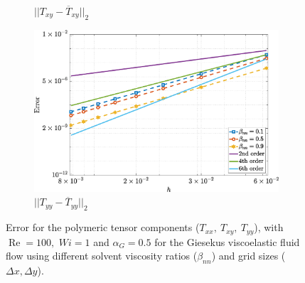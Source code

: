 \documentclass[preprint, 12pt]{elsarticle}
\begin{document}
\begin{figure}[H]
\begin{subfigure}[b]{.46\textwidth}
        \caption{$||T_{xy} - \overline{T}_{xy}||_{2}$}
        \label{error_txy_2nd_Case1_giesekus_alphaG_0.5}
    \end{subfigure}
    \qquad
    \begin{subfigure}[b]{.46\textwidth}
        \includegraphics[width=\textwidth]{NormErr_2nd_Re_100_Wi_1_epsilon_0_xi_0_alphaG_0.5_Dt_1e-06_at_0.05_tipsim_1_MMS_12_Tyy.eps}
        \caption{$||T_{yy} - \overline{T}_{yy}||_{2}$}
        \label{error_tyy_2nd_Case1_giesekus_alphaG_0.5}
    \end{subfigure}
    \vspace{0.02cm}
    \caption{Error for the polymeric tensor components ($T_{xx},~T_{xy},~T_{yy}$), with $\operatorname{Re}=100,$ $Wi=1$ and $\alpha_{G} = 0.5$ for the Giesekus viscoelastic fluid flow using different solvent viscosity ratios ($\beta_{nn}$) and grid sizes ($\Delta x, \Delta y$).\label{GEerror052}}
\end{figure}
\end{document}
